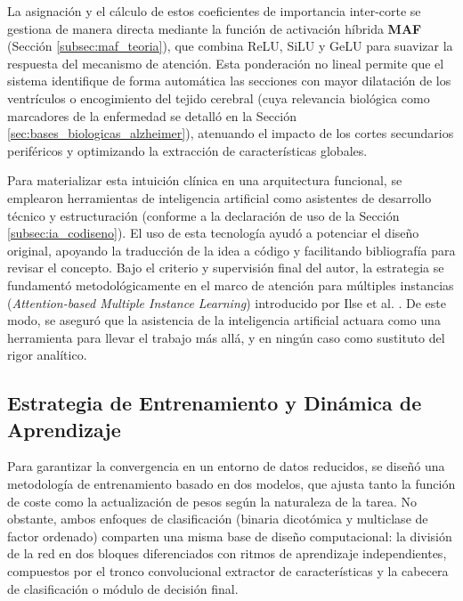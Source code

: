 \documentclass[12pt, oneside, english, spanish]{book}
\begin{document}
La asignación y el cálculo de estos coeficientes de importancia inter-corte se gestiona de manera directa mediante la función de activación híbrida \textbf{MAF} (Sección \ref{subsec:maf_teoria}), que combina ReLU, SiLU y GeLU para suavizar la respuesta del mecanismo de atención. Esta ponderación no lineal permite que el sistema identifique de forma automática las secciones con mayor dilatación de los ventrículos o encogimiento del tejido cerebral (cuya relevancia biológica como marcadores de la enfermedad se detalló en la Sección \ref{sec:bases_biologicas_alzheimer}), atenuando el impacto de los cortes secundarios periféricos y optimizando la extracción de características globales.

Para materializar esta intuición clínica en una arquitectura funcional, se emplearon herramientas de inteligencia artificial como asistentes de desarrollo técnico y estructuración (conforme a la declaración de uso de la Sección \ref{subsec:ia_codiseno}). El uso de esta tecnología ayudó a potenciar el diseño original, apoyando la traducción de la idea a código y facilitando bibliografía para revisar el concepto. Bajo el criterio y supervisión final del autor, la estrategia se fundamentó metodológicamente en el marco de atención para múltiples instancias (\textit{Attention-based Multiple Instance Learning}) introducido por Ilse et al. \cite{ilse2018attention}. De este modo, se aseguró que la asistencia de la inteligencia artificial actuara como una herramienta para llevar el trabajo más allá, y en ningún caso como sustituto del rigor analítico.

\subsection{Estrategia de Entrenamiento y Dinámica de Aprendizaje} \label{subsec:estrategia_entrenamiento}

Para garantizar la convergencia en un entorno de datos reducidos, se diseñó una metodología de entrenamiento basado en dos modelos, que ajusta tanto la función de coste como la actualización de pesos según la naturaleza de la tarea. No obstante, ambos enfoques de clasificación (binaria dicotómica y multiclase de factor ordenado) comparten una misma base de diseño computacional: la división de la red en dos bloques diferenciados con ritmos de aprendizaje independientes, compuestos por el tronco convolucional extractor de características y la cabecera de clasificación o módulo de decisión final.
\end{document}
